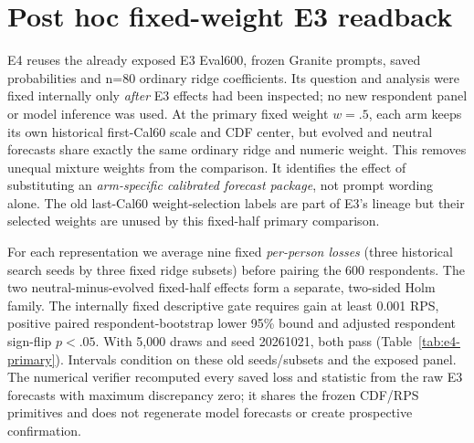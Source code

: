 \section{Post hoc fixed-weight E3 readback}\label{sec:e4-fixed}
E4 reuses the already exposed E3 Eval600, frozen Granite prompts, saved
probabilities and n=80 ordinary ridge coefficients. Its question and analysis
were fixed internally only \emph{after} E3 effects had been inspected; no new
respondent panel or model inference was used. At the primary fixed weight
$w=.5$, each arm keeps its own historical first-Cal60 scale and CDF center,
but evolved and neutral forecasts share exactly the same ordinary ridge and
numeric weight. This removes unequal mixture weights from the comparison.
It identifies the effect of substituting an \emph{arm-specific calibrated
forecast package}, not prompt wording alone. The old last-Cal60
weight-selection labels are part of E3's lineage but their selected weights
are unused by this fixed-half primary comparison.

For each representation we average nine fixed \emph{per-person losses}
(three historical search seeds by three fixed ridge subsets) before pairing
the 600 respondents. The two neutral-minus-evolved fixed-half effects form a
separate, two-sided Holm family. The internally fixed descriptive gate
requires gain at least 0.001 RPS, positive paired respondent-bootstrap lower
95\% bound and adjusted respondent sign-flip $p<.05$. With 5,000 draws and
seed 20261021, both pass (Table~\ref{tab:e4-primary}). Intervals condition
on these old seeds/subsets and the exposed panel. The numerical verifier
recomputed every saved loss and statistic from the raw E3 forecasts with
maximum discrepancy zero; it shares the frozen CDF/RPS primitives and does
not regenerate model forecasts or create prospective confirmation.

\begin{table}[H]\centering\scriptsize
\caption{E4 fixed-half calibrated-package comparisons on exposed E3
respondents ($N=600$). Positive is neutral minus evolved RPS, lower scores
being better. Both rows form the Holm-2 family and pass the descriptive
0.001-RPS/positive-CI/adjusted-$p$ rule.}
\label{tab:e4-primary}
\end{table}

